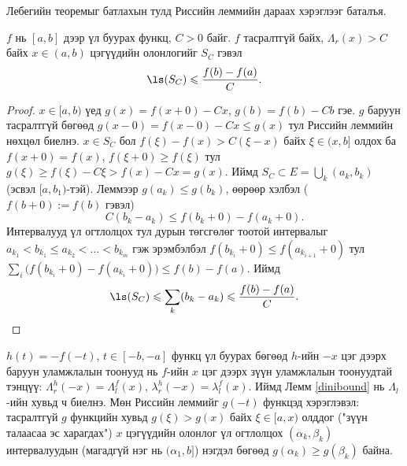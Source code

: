 Лебегийн теоремыг батлахын тулд Риссийн леммийн дараах хэрэглээг баталъя.
\begin{lem}\label{dinibound}
$f$ нь $[a,b]$ дээр үл буурах функц, $C>0$ байг. $f$ тасралтгүй байх, $\Lambda_r(x)>C$ байх $x\in(a,b)$ цэгүүдийн олонлогийг $S_C$ гэвэл
$$\ls(S_C)\leqslant\frac{f(b)-f(a)}{C}.$$
\end{lem}
\begin{proof}
$x\in[a,b)$ үед $g(x)=f(x+0)-Cx$, $g(b)=f(b)-Cb$ гэе. $g$ баруун тасралтгүй бөгөөд $g(x-0)=f(x-0)-Cx\leqslant g(x)$ тул Риссийн леммийн нөхцөл биелнэ. $x\in S_C$ бол $f(\xi)-f(x)>C(\xi-x)$ байх $\xi\in(x,b]$ олдох ба $f(x+0)=f(x)$, $f(\xi+0)\geqslant f(\xi)$ тул $g(\xi)\geqslant f(\xi)-C\xi>f(x)-Cx=g(x)$. Иймд $S_C\subset E=\bigcup_k(a_k,b_k)$ (эсвэл $[a,b_1)$-тэй). Леммээр $g(a_k)\leqslant g(b_k)$, өөрөөр хэлбэл ($f(b+0):=f(b)$ гэвэл)
$$C(b_k-a_k)\leqslant f(b_k+0)-f(a_k+0).$$
Интервалууд үл огтлолцох тул дурын төгсгөлөг тоотой интервалыг $a_{k_1}<b_{k_1}\leqslant a_{k_2}<\ldots<b_{k_m}$ гэж эрэмбэлбэл $f(b_{k_i}+0)\leqslant f(a_{k_{i+1}}+0)$ тул $\sum\limits_{i}\bigl(f(b_{k_i}+0)-f(a_{k_i}+0)\bigr)\leqslant f(b)-f(a)$. Иймд
$$\ls(S_C)\leqslant\sum_k(b_k-a_k)\leqslant\frac{f(b)-f(a)}{C}.$$
\end{proof}
\begin{hnt}
$h(t)=-f(-t)$, $t\in[-b,-a]$ функц үл буурах бөгөөд $h$-ийн $-x$ цэг дээрх баруун уламжлалын тоонууд нь $f$-ийн $x$ цэг дээрх зүүн уламжлалын тоонуудтай тэнцүү: $\Lambda_r^h(-x)=\Lambda_l^f(x)$, $\lambda_r^h(-x)=\lambda_l^f(x)$. Иймд Лемм \ref{dinibound} нь $\Lambda_l$-ийн хувьд ч биелнэ. Мөн Риссийн леммийг $g(-t)$ функцэд хэрэглэвэл: тасралтгүй $g$ функцийн хувьд $g(\xi)>g(x)$ байх $\xi\in[a,x)$ олддог ("зүүн талаасаа эс харагдах") $x$ цэгүүдийн олонлог үл огтлолцох $(\alpha_k,\beta_k)$ интервалуудын (магадгүй нэг нь $(\alpha_1,b]$) нэгдэл бөгөөд $g(\alpha_k)\geqslant g(\beta_k)$ байна.
\end{hnt}

